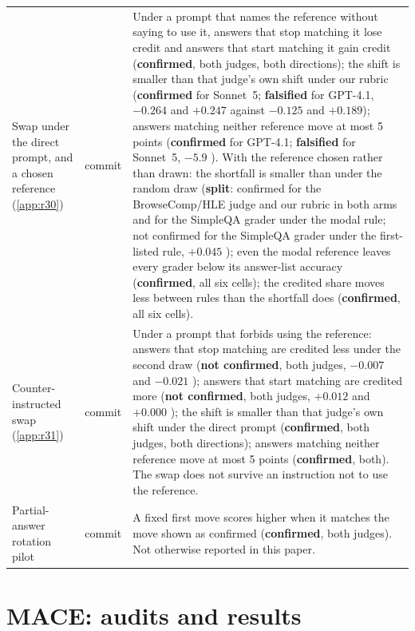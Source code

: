 {\begin{longtable}{L{3.2cm}L{1.1cm}L{8.7cm}}
Swap under the direct prompt, and a chosen reference (\cref{app:r30}) & commit & Under a prompt that names the reference without saying to use it, answers that stop matching it lose credit and answers that start matching it gain credit (\textbf{confirmed}, both judges, both directions); the shift is smaller than that judge's own shift under our rubric (\textbf{confirmed} for Sonnet~5; \textbf{falsified} for GPT-4.1, $-0.264$ and $+0.247$ against $-0.125$ and $+0.189$); answers matching neither reference move at most 5 points (\textbf{confirmed} for GPT-4.1; \textbf{falsified} for Sonnet~5, $-5.9$ ). With the reference chosen rather than drawn: the shortfall is smaller than under the random draw (\textbf{split}: confirmed for the BrowseComp/HLE judge and our rubric in both arms and for the SimpleQA grader under the modal rule; not confirmed for the SimpleQA grader under the first-listed rule, $+0.045$ ); even the modal reference leaves every grader below its answer-list accuracy (\textbf{confirmed}, all six cells); the credited share moves less between rules than the shortfall does (\textbf{confirmed}, all six cells). \\
Counter-instructed swap (\cref{app:r31}) & commit & Under a prompt that forbids using the reference: answers that stop matching are credited less under the second draw (\textbf{not confirmed}, both judges, $-0.007$  and $-0.021$ ); answers that start matching are credited more (\textbf{not confirmed}, both judges, $+0.012$  and $+0.000$ ); the shift is smaller than that judge's own shift under the direct prompt (\textbf{confirmed}, both judges, both directions); answers matching neither reference move at most 5 points (\textbf{confirmed}, both). The swap does not survive an instruction not to use the reference. \\
Partial-answer rotation pilot & commit & A fixed first move scores higher when it matches the move shown as confirmed (\textbf{confirmed}, both judges). Not otherwise reported in this paper. \\
\end{longtable}
}

\FloatBarrier
\section{\textsc{MACE}: audits and results}
\label{app:mace}

